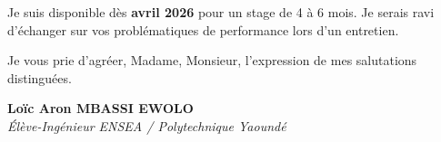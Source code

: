 \documentclass[a4paper,11pt]{article}
\begin{document}
Je suis disponible dès \textbf{avril 2026} pour un stage de 4 à 6 mois. Je serais ravi d'échanger sur vos problématiques de performance lors d'un entretien.

Je vous prie d'agréer, Madame, Monsieur, l'expression de mes salutations distinguées.

\vspace{1cm}

\textbf{Loïc Aron MBASSI EWOLO}\\
\textit{Élève-Ingénieur ENSEA / Polytechnique Yaoundé}
\end{document}
